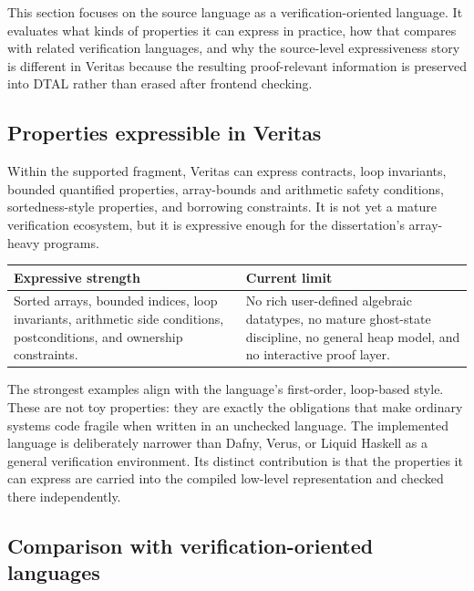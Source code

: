 This section focuses on the source language as a verification-oriented language. It evaluates what kinds of properties it can express in practice, how that compares with related verification languages, and why the source-level expressiveness story is different in Veritas because the resulting proof-relevant information is preserved into DTAL rather than erased after frontend checking.

\subsection{Properties expressible in Veritas}

Within the supported fragment, Veritas can express contracts, loop invariants, bounded quantified properties, array-bounds and arithmetic safety conditions, sortedness-style properties, and borrowing constraints. It is not yet a mature verification ecosystem, but it is expressive enough for the dissertation's array-heavy programs.

\begin{center}
\small
\begin{tabularx}{0.96\textwidth}{>{\raggedright\arraybackslash}p{} >{\raggedright\arraybackslash}X}
\toprule
\textbf{Expressive strength} & \textbf{Current limit} \\
\midrule
Sorted arrays, bounded indices, loop invariants, arithmetic side conditions, postconditions, and ownership constraints. & No rich user-defined algebraic datatypes, no mature ghost-state discipline, no general heap model, and no interactive proof layer. \\
\bottomrule
\end{tabularx}
\end{center}

The strongest examples align with the language's first-order, loop-based style. These are not toy properties: they are exactly the obligations that make ordinary systems code fragile when written in an unchecked language. The implemented language is deliberately narrower than Dafny, Verus, or Liquid Haskell as a general verification environment. Its distinct contribution is that the properties it can express are carried into the compiled low-level representation and checked there independently.

\subsection{Comparison with verification-oriented languages}

